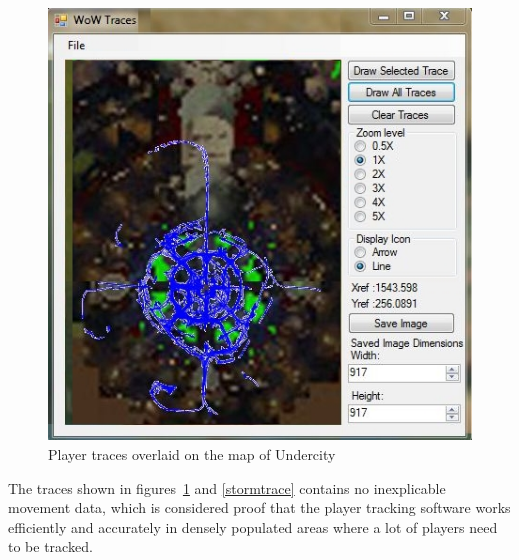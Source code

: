 \begin{figure}[htbp]
\centering
\includegraphics[scale = 0.75]{underlaycity.png}	
\caption{Player traces overlaid on the map of Undercity}
\label{undertrace}
\end{figure}

The traces shown in figures~\ref{undertrace} and \ref{stormtrace} contains no inexplicable movement data, which is considered proof that the player tracking software works efficiently and accurately in densely populated areas where a lot of players need to be tracked.



